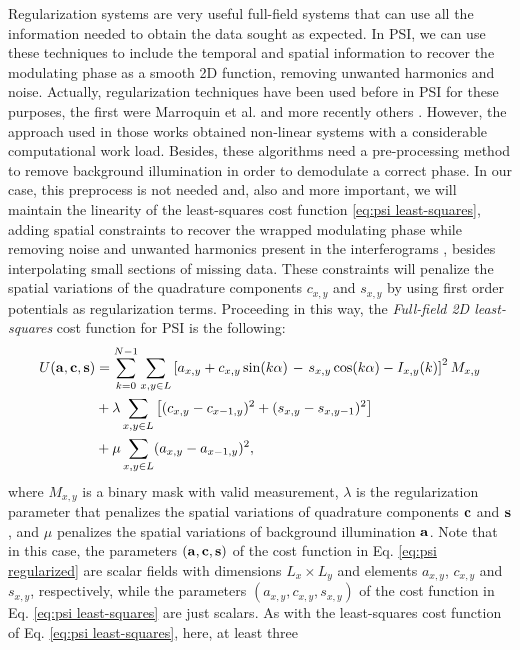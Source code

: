Regularization systems are very useful full-field systems
that can use all the information needed to obtain the data sought as
expected. In PSI, we can use these techniques to include the temporal
and spatial information to recover the modulating phase as a smooth
2D function, removing unwanted harmonics and noise. Actually,
regularization techniques have been used before in PSI for these
purposes, the first were Marroquin et al. \cite{RQF,AQF,AQF_mult} and more
recently others \cite{RPT, RQPT, Mariano, Mariano2, Vargas,Medina,Zeng}.
However, the approach used in those works obtained non-linear systems with a
considerable computational work load. Besides, these algorithms need a
pre-processing method to remove background illumination in order to
demodulate a correct phase. In our case, this preprocess is not needed and, also
and more important, we will maintain the linearity of the least-squares cost
function \eqref{eq:psi least-squares}, adding spatial constraints to recover the
wrapped modulating phase while removing noise and unwanted harmonics present in
the interferograms \cite{RQF}, besides interpolating small sections of missing
data. These constraints will penalize the spatial variations of the quadrature
components $c_{x,y}$ and $s_{x,y}$ by using first order potentials as
regularization terms. Proceeding in this way, the \emph{Full-field 2D
least-squares} cost function for PSI is the following:
\begin{align}
  U(\bf{a,c,s})&=\sum_{k=0}^{N-1} \sum_{x,y\in L} \left[a_{x,y} + 
  c_{x,y}\sin(k\alpha)\right.
  -\left. s_{x,y}\cos(k\alpha)-I_{x,y}(k) \right]^2 M_{x,y}\nonumber \\
  &+\lambda\sum_{x,y\in L}
  \left[(c_{x,y}-c_{x-1,y})^2+(s_{x,y}-s_{x,y-1})^2\right]
  \nonumber\\
  &+\mu\sum_{x,y\in L}(a_{x,y}-a_{x-1,y})^2,
  \label{eq:psi regularized}
\end{align}
where $M_{x,y}$ is a binary mask with valid measurement, $\lambda$ is the
regularization parameter that penalizes the spatial variations of quadrature
components $\bf c$ and $\bf s$, and $\mu$ penalizes the spatial variations of
background illumination $\bf a$. Note that in this case, the parameters
$(\bf{a,c,s})$ of the cost function in Eq. \eqref{eq:psi regularized} are
scalar fields with dimensions $L_x\times L_y$ and elements $a_{x,y}$,
$c_{x,y}$ and $s_{x,y}$, respectively, while the parameters
$(a_{x,y},c_{x,y},s_{x,y})$ of the cost function in Eq. \eqref{eq:psi
  least-squares} are just scalars. As with the least-squares cost
function of Eq. \eqref{eq:psi least-squares}, here, at least three
